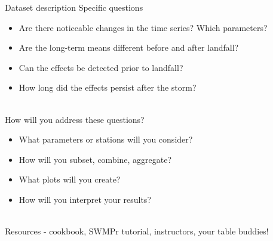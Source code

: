 \documentclass[xcolor=svgnames]{beamer}\usepackage[]{graphicx}\usepackage[]{color}
\newcommand{\Bigtxt}[1]{\textbf{\textit{#1}}}
\begin{document}
\begin{frame}{Dataset description}
Specific questions
\begin{itemize}
\item Are there noticeable changes in the time series? Which parameters?
\item Are the long-term means different before and after landfall?
\item Can the effects be detected prior to landfall?
\item How long did the effects persist after the storm? \\~\\
\end{itemize}
How will you address these questions?
\begin{itemize}
\item What parameters or stations will you consider?
\item How will you subset, combine, aggregate?
\item What plots will you create?
\item How will you interpret your results? \\~\\
\end{itemize}
Resources - cookbook, SWMPr tutorial, instructors, your table buddies!
\end{frame}

\end{document}

